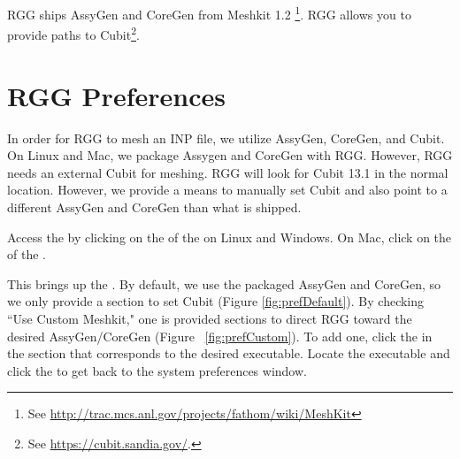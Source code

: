 RGG ships AssyGen and CoreGen from Meshkit 1.2 \footnote{See \url{http://trac.mcs.anl.gov/projects/fathom/wiki/MeshKit}}.  RGG allows you to provide paths to Cubit\footnote{See \url{https://cubit.sandia.gov/}.}.

\section{RGG Preferences}

In order for RGG to mesh an INP file, we utilize AssyGen, CoreGen, and Cubit.  On Linux and Mac, we package Assygen and CoreGen with RGG.  However, RGG needs an external Cubit for meshing.  RGG will look for Cubit 13.1 in the normal location.  However, we provide a means to manually set Cubit and also point to a different AssyGen and CoreGen than what is shipped.

Access the  by clicking on the  of the  on Linux and Windows.  On Mac, click on the  of the .

This brings up the .  By default, we use the packaged AssyGen and CoreGen, so we only provide a section to set Cubit (Figure \ref{fig:prefDefault}).  By checking ``Use Custom Meshkit," one is provided sections to direct RGG toward the desired AssyGen/CoreGen (Figure ~\ref{fig:prefCustom}).  To add one, click the  in the section that corresponds to the desired executable.  Locate the executable and click the  to get back to the system preferences window.

